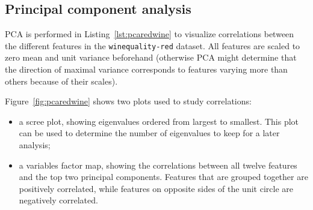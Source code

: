 \documentclass[12pt]{article}
\begin{document}
  \subsection{Principal component analysis}

  PCA is performed in Listing~\ref{lst:pcaredwine} to visualize correlations
  between the different features in the \lstinline{winequality-red} dataset.
  All features are scaled to zero mean and unit variance beforehand (otherwise
  PCA might determine that the direction of maximal variance corresponds to
  features varying more than others because of their scales).

  Figure~\ref{fig:pcaredwine} shows two plots used to study correlations:
  \begin{itemize}
    \item a scree plot, showing eigenvalues ordered from largest to smallest.
      This plot can be used to determine the number of eigenvalues to keep for
      a later analysis;
    \item a variables factor map, showing the correlations between all twelve
      features and the top two principal components. Features that are grouped
      together are positively correlated, while features on opposite sides of
      the unit circle are negatively correlated.
  \end{itemize}
\end{document}
